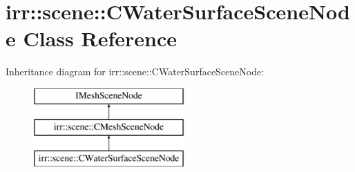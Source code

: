 \hypertarget{classirr_1_1scene_1_1_c_water_surface_scene_node}{\section{irr\-:\-:scene\-:\-:C\-Water\-Surface\-Scene\-Node Class Reference}
\label{classirr_1_1scene_1_1_c_water_surface_scene_node}
}
Inheritance diagram for irr\-:\-:scene\-:\-:C\-Water\-Surface\-Scene\-Node\-:\begin{figure}[H]
\begin{center}
\leavevmode
\includegraphics[height=3.000000cm]{classirr_1_1scene_1_1_c_water_surface_scene_node}
\end{center}
\end{figure}
